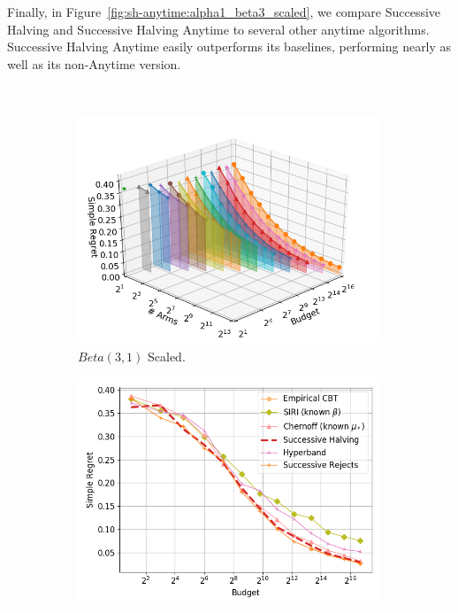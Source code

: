 Finally, in Figure~\ref{fig:sh-anytime:alpha1_beta3_scaled}, we compare Successive Halving 
and Successive Halving Anytime to several other anytime algorithms.
Successive Halving Anytime easily outperforms its baselines,
performing nearly as well as its non-Anytime version. 

​​​​​\begin{figure}
\centering
\begin{subfigure}{0.325\textwidth}%
	\includegraphics[width=\textwidth]{fixedbudget/figures/folder1/alpha1_beta3_scaled.png}
	\centering
	\caption{$Beta(3,1)$ Scaled.}
	\label{fig:sh-num-arms:alpha1_beta3_scaled}
\end{subfigure}
\begin{subfigure}{0.325\textwidth}%
	\includegraphics[width=\textwidth]{fixedbudget/figures/folder4/alpha1_beta3_scaled.png}

\end{subfigure}
\end{figure}
